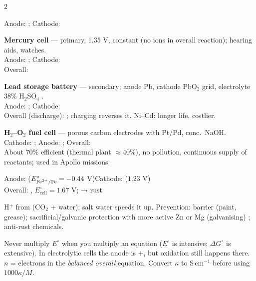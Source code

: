 \documentclass[9pt,a4paper]{extarticle}
\begin{document}
\begin{multicols}{2}
\begin{fl}
 Anode: ; \;Cathode: 
\item \textbf{Mercury cell} — primary, 1.35 V, constant (no ions in overall reaction); hearing aids, watches.\\
 Anode: ; Cathode: \\
 Overall: 
\item \textbf{Lead storage battery} — secondary; anode Pb, cathode PbO$_2$ grid, electrolyte 38\% H$_2$SO$_4$ \SQP.\\
 Anode: ; Cathode: \\
 Overall (discharge): ; charging reverses it. Ni--Cd: longer life, costlier.
\item \textbf{H$_2$--O$_2$ fuel cell} \SQP — porous carbon electrodes with Pt/Pd, conc.\ NaOH.\\
 Cathode: ; Anode: ; Overall: \\
 About 70\% efficient (thermal plant $\approx$40\%), no pollution, continuous supply of reactants; used in Apollo missions.
\end{fl}
\begin{kbox}
Anode:  ($E^\circ_{\ce{Fe^2+/Fe}}=-0.44$ V)\quad Cathode:  ($1.23$ V)\\
Overall: , $E^\circ_\text{cell}=1.67$ V;  → rust 
\end{kbox}
\begin{fl}
\item H$^+$ from  (CO$_2$ + water); salt water speeds it up. Prevention: barrier (paint, grease); sacrificial/galvanic protection with more active Zn or Mg (galvanising) \SQP; anti-rust chemicals.
\end{fl}
\begin{tip}\Tip Never multiply $E^\circ$ when you multiply an equation ($E^\circ$ is intensive; $\Delta G^\circ$ is extensive). In electrolytic cells the anode is $+$, but oxidation still happens there. $n$ = electrons in the \emph{balanced overall} equation. Convert $\kappa$ to S\,cm$^{-1}$ before using $1000\kappa/M$.\end{tip}
\begin{numbox}\Num\par\scriptsize

\end{numbox}
\end{multicols}
\end{document}
